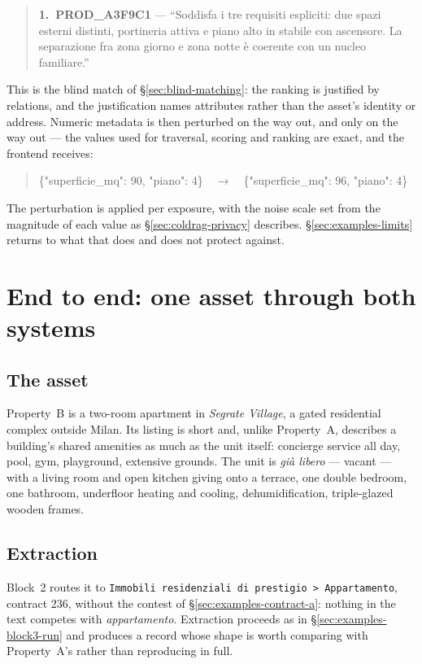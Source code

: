 \begin{quote}\small
\textbf{1.\ PROD\_A3F9C1} --- ``Soddisfa i tre requisiti espliciti: due spazi esterni distinti, portineria attiva e piano alto in stabile con ascensore. La separazione fra zona giorno e zona notte è coerente con un nucleo familiare.''
\end{quote}

This is the blind match of \S\ref{sec:blind-matching}: the ranking is justified by relations, and the justification names attributes rather than the asset's identity or address. Numeric metadata is then perturbed on the way out, and only on the way out --- the values used for traversal, scoring and ranking are exact, and the frontend receives:

\begin{quote}\small\ttfamily
\{"superficie\_mq": 90, "piano": 4\}\ \ $\longrightarrow$\ \ \{"superficie\_mq": 96, "piano": 4\}
\end{quote}

The perturbation is applied per exposure, with the noise scale set from the magnitude of each value as \S\ref{sec:coldrag-privacy} describes. \S\ref{sec:examples-limits} returns to what that does and does not protect against.


\section{End to end: one asset through both systems}
\label{sec:examples-e2e}

\subsection{The asset}
Property~B is a two-room apartment in \emph{Segrate Village}, a gated residential complex outside Milan. Its listing is short and, unlike Property~A, describes a building's shared amenities as much as the unit itself: concierge service all day, pool, gym, playground, extensive grounds. The unit is \emph{già libero} --- vacant --- with a living room and open kitchen giving onto a terrace, one double bedroom, one bathroom, underfloor heating and cooling, dehumidification, triple-glazed wooden frames.

\subsection{Extraction}

Block~2 routes it to \texttt{Immobili residenziali di prestigio > Appartamento}, contract 236, without the contest of \S\ref{sec:examples-contract-a}: nothing in the text competes with \emph{appartamento}. Extraction proceeds as in \S\ref{sec:examples-block3-run} and produces a record whose shape is worth comparing with Property~A's rather than reproducing in full.

